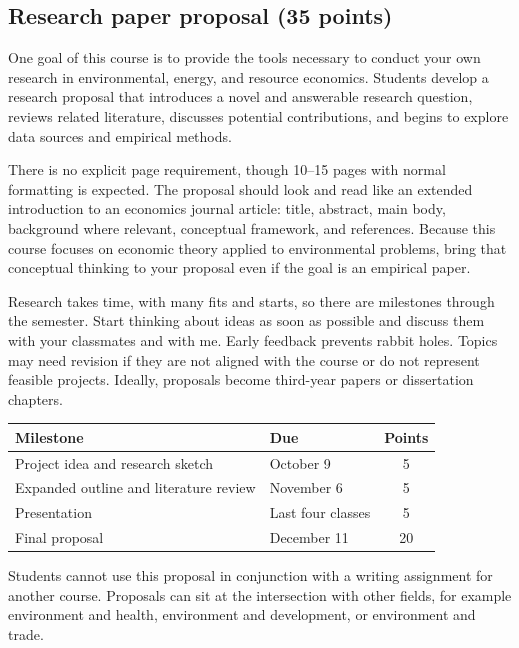 \subsection*{Research paper proposal (35 points)}
One goal of this course is to provide the tools necessary to conduct your own research in environmental, energy, and resource economics. Students develop a research proposal that introduces a novel and answerable research question, reviews related literature, discusses potential contributions, and begins to explore data sources and empirical methods.

\noindent There is no explicit page requirement, though 10--15 pages with normal formatting is expected. The proposal should look and read like an extended introduction to an economics journal article: title, abstract, main body, background where relevant, conceptual framework, and references. Because this course focuses on economic theory applied to environmental problems, bring that conceptual thinking to your proposal even if the goal is an empirical paper.

\noindent Research takes time, with many fits and starts, so there are milestones through the semester. Start thinking about ideas as soon as possible and discuss them with your classmates and with me. Early feedback prevents rabbit holes. Topics may need revision if they are not aligned with the course or do not represent feasible projects. Ideally, proposals become third-year papers or dissertation chapters.

\begin{center}
\begin{tabular}{llc}
\toprule
\textbf{Milestone} & \textbf{Due} & \textbf{Points} \\
\midrule
Project idea and research sketch		& October 9		& 5 \\
Expanded outline and literature review	& November 6	& 5 \\
Presentation							& Last four classes & 5 \\
Final proposal							& December 11	& 20 \\
\bottomrule
\end{tabular}
\end{center}

\noindent Students cannot use this proposal in conjunction with a writing assignment for another course. Proposals can sit at the intersection with other fields, for example environment and health, environment and development, or environment and trade.

